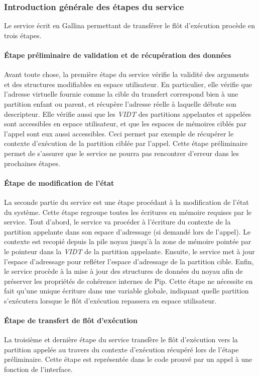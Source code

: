 			\subsubsection{Introduction générale des étapes du service}

			Le service écrit en Gallina permettant de transférer le flôt d'exécution procède en trois étapes.

			\paragraph{Étape préliminaire de validation et de récupération des données} Avant toute chose, la première étape du service vérifie la validité des arguments et des structures modifiables en espace utilisateur. En particulier, elle vérifie que l'adresse virtuelle fournie comme la cible du transfert correspond bien à une partition enfant ou parent, et récupère l'adresse réelle à laquelle débute son descripteur. Elle vérifie aussi que les \emph{VIDT} des partitions appelantes et appelées sont accessibles en espace utilisateur, et que les espaces de mémoires ciblés par l'appel sont eux aussi accessibles. Ceci permet par exemple de récupérer le contexte d'exécution de la partition ciblée par l'appel. Cette étape préliminaire permet de s'assurer que le service ne pourra pas rencontrer d'erreur dans les prochaines étapes.

			\paragraph{Étape de modification de l'état} La seconde partie du service est une étape procédant à la modification de l'état du système. Cette étape regroupe toutes les écritures en mémoire requises par le service. Tout d'abord, le service va procéder à l'écriture du contexte de la partition appelante dans son espace d'adressage (si demandé lors de l'appel). Le contexte est recopié depuis la pile noyau jusqu'à la zone de mémoire pointée par le pointeur dans la \emph{VIDT} de la partition appelante.
			Ensuite, le service met à jour l'espace d'adressage pour refléter l'espace d'adressage de la partition cible.
			Enfin, le service procède à la mise à jour des structures de données du noyau afin de préserver les propriétés de cohérence internes de Pip. Cette étape ne nécessite en fait qu'une unique écriture dans une variable globale, indiquant quelle partition s'exécutera lorsque le flôt d'exécution repassera en espace utilisateur.

			\paragraph{Étape de transfert de flôt d'exécution} La troisième et dernière étape du service transfère le flôt d'exécution vers la partition appelée au travers du contexte d'exécution récupéré lors de l'étape préliminaire. Cette étape est représentée dans le code prouvé par un appel à une fonction de l'interface.

